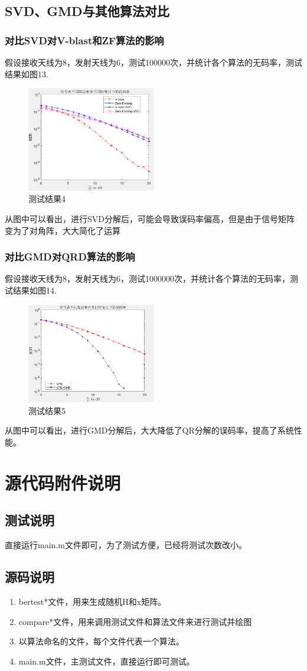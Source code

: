 \documentclass[a4paper,12pt]{article}
\begin{document}
	\subsection{SVD、GMD与其他算法对比}
	\subsubsection{对比SVD对V-blast和ZF算法的影响}
	假设接收天线为8，发射天线为6，测试100000次，并统计各个算法的无码率，测试结果如图13.\par 
	\begin{figure}[h]
		\centering
		\includegraphics[width=0.5\textwidth]{15.png}
		\caption{测试结果4}
	\end{figure}
	从图中可以看出，进行SVD分解后，可能会导致误码率偏高，但是由于信号矩阵变为了对角阵，大大简化了运算
	\subsubsection{对比GMD对QRD算法的影响}
	假设接收天线为8，发射天线为6，测试1000000次，并统计各个算法的无码率，测试结果如图14.\par 
	\begin{figure}[h]
		\centering
		\includegraphics[width=0.5\textwidth]{16.png}
		\caption{测试结果5}
	\end{figure}
	从图中可以看出，进行GMD分解后，大大降低了QR分解的误码率，提高了系统性能。
	\section{源代码附件说明}
	\subsection{测试说明}
	直接运行main.m文件即可，为了测试方便，已经将测试次数改小。
	\subsection{源码说明}
	\begin{enumerate}
		\item bertest*文件，用来生成随机H和x矩阵。
		\item compare*文件，用来调用测试文件和算法文件来进行测试并绘图
		\item 以算法命名的文件，每个文件代表一个算法。
		\item  main.m文件，主测试文件，直接运行即可测试。
	\end{enumerate}
\end{document}
